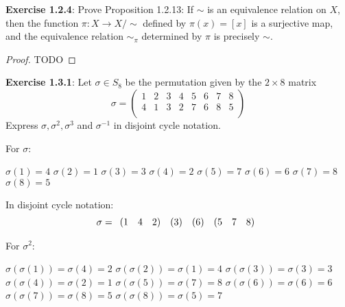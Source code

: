 \documentclass[a4paper]{article}
\begin{document}
\begin{myparindent}{0pt}
\textbf{Exercise 1.2.4}:
Prove Proposition 1.2.13: If $\sim$ is an equivalence relation on $X$, then the function $\pi: X \rightarrow X/\sim$
defined by $\pi(x) = [x]$ is a surjective map, and the equivalence relation $\sim_{\pi}$ determined by $\pi$ is
precisely $\sim$. \newline

\begin{proof}
TODO \newline
\end{proof}

\textbf{Exercise 1.3.1}:
Let $\sigma \in S_8$ be the permutation given by the $2 \times 8$ matrix \newline
\[
  \sigma =
  \begin{pmatrix}
    1 & 2 & 3 & 4 & 5 & 6 & 7 & 8 \\
    4 & 1 & 3 & 2 & 7 & 6 & 8 & 5 \\
  \end{pmatrix}
\]
Express $\sigma, \sigma^2, \sigma^3$ and $\sigma^{-1}$ in disjoint cycle notation. \newline

For $\sigma$:

$\sigma(1) = 4$ \newline
$\sigma(2) = 1$ \newline
$\sigma(3) = 3$ \newline
$\sigma(4) = 2$ \newline
$\sigma(5) = 7$ \newline
$\sigma(6) = 6$ \newline
$\sigma(7) = 8$ \newline
$\sigma(8) = 5$ \newline

In disjoint cycle notation:
\[
    \noindent \sigma = \begin{array}{rrr} (1 & 4 & 2) \end{array}
    \noindent \begin{array}{r} (3) \end{array}
    \noindent \begin{array}{r} (6) \end{array}
    \noindent \begin{array}{rrr} (5 & 7 & 8) \end{array}
\]

For $\sigma^2$:

$\sigma(\sigma(1)) = \sigma(4) = 2$ \newline
$\sigma(\sigma(2)) = \sigma(1) = 4$ \newline
$\sigma(\sigma(3)) = \sigma(3) = 3$ \newline
$\sigma(\sigma(4)) = \sigma(2) = 1$ \newline
$\sigma(\sigma(5)) = \sigma(7) = 8$ \newline
$\sigma(\sigma(6)) = \sigma(6) = 6$ \newline
$\sigma(\sigma(7)) = \sigma(8) = 5$ \newline
$\sigma(\sigma(8)) = \sigma(5) = 7$ \newline


\end{myparindent}
\end{document}
